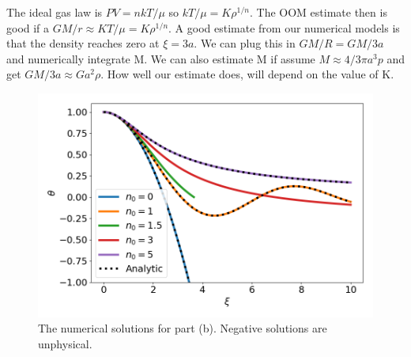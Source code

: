 \documentclass[11pt]{article}
\begin{document}
\begin{enumerate}[label=\alph*)]
       The ideal gas law is $PV = n kT / \mu$ so $kT/\mu = K \rho^{1/n}$.
       The OOM estimate then is good if a $G M / r \approx KT / \mu = K \rho^{1/n}$.
       A good estimate from our numerical models is that the density reaches zero at $\xi = 3a$.
         We can plug this in $G M / R = G M / 3a$ and numerically integrate M.
       We can also estimate M if assume $M \approx 4/3 \pi a^{3} p$ and get $GM / 3a \approx  G a^{2} \rho$.
       How well our estimate does, will depend on the value of K.
\end{enumerate}
\begin{figure}[htbp]
\centering
\includegraphics[width=.9\linewidth]{../plots/problem4.png}
\caption{\label{fig:problem4}The numerical solutions for part (b). Negative solutions are unphysical.}
\end{figure}
\end{document}
